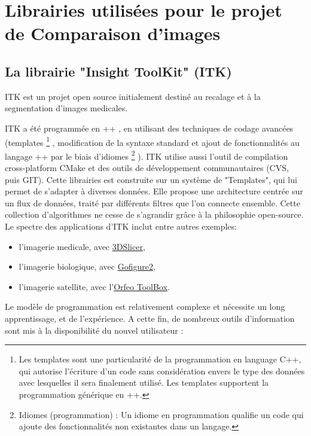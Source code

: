 


\chapter{Librairies utilisées pour le projet de Comparaison d'images}
\label{AnnexeDescriptionITKVTKQT}


\section*{La librairie "Insight ToolKit" (ITK)} 
ITK est un projet open source initialement destiné au recalage et à la segmentation d'images medicales.

ITK a été programmée en \C++ , en utilisant des techniques de codage avancées (templates
\footnote{Les templates sont une particularité de la programmation en language C++, qui autorise l'écriture d'un code sans considération envers le type des données avec lesquelles il sera finalement utilisé. Les templates supportent la programmation générique en {\C++}.}
, modification de la syntaxe standard et ajout de fonctionnalités au langage \C++ par le biais d'idiomes
\footnote{Idiomes (programmation) :  Un idiome en programmation qualifie un code qui ajoute des fonctionnalités non existantes dans un langage.}
).
ITK utilise aussi l'outil de compilation cross-platform CMake et des outils de développement communautaires (CVS, puis GIT). 
Cette librairies est construite sur un système de "Templates", qui lui permet de s'adapter à diverses données. Elle propose une architecture centrée sur un flux de données, traité par différents filtres que l'on connecte ensemble.
Cette collection d'algorithmes ne cesse de s'agrandir grâce à la philosophie open-source. Le spectre des applications d'ITK inclut entre autres exemples:  
\begin{itemize}
  \item l'imagerie medicale, avec \href{http://www.slicer.org/}{3DSlicer},
  \item l'imagerie biologique, avec \href{http://gofigure2.sourceforge.net/}{Gofigure2},
  \item l'imagerie satellite, avec l'\href{http://www.orfeo-toolbox.org/otb/}{Orfeo ToolBox}.
\end{itemize}
Le modèle de programmation est relativement complexe et nécessite un long apprentissage, et de l'expérience. A cette fin, de nombreux outils d'information sont mis à la disponibilité du nouvel utilisateur :
